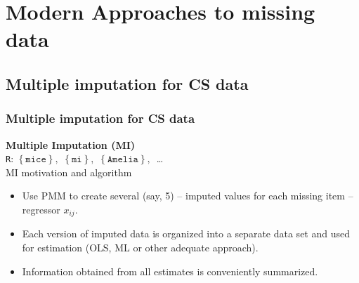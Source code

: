 \documentclass{beamer}
\begin{document}
\section{Modern Approaches to missing data}
\subsection{Multiple imputation for CS data}
\begin{frame}
\frametitle{Multiple imputation  for CS data}
\textbf{Multiple Imputation (MI) }\\
\texttt{R}: $\left\lbrace \texttt{mice}  \right\rbrace , \,\, \left\lbrace \texttt{mi}  \right\rbrace, \,\, \left\lbrace \texttt{Amelia}  \right\rbrace, \, $ \dots\\
  \vspace{0.5cm}
MI motivation and algorithm\\
  \vspace{0.2cm}
  \begin{itemize}
  \item Use PMM to create several  (say, 5) -- imputed values for each missing item -- regressor $x_{ij}$.
  \medskip
  \item Each version of imputed data is organized into a separate data set and used for estimation (OLS, ML or other adequate approach).
  \medskip
  \item Information obtained from all estimates is conveniently summarized.
 \end{itemize}
 \end{frame}
\end{document}
